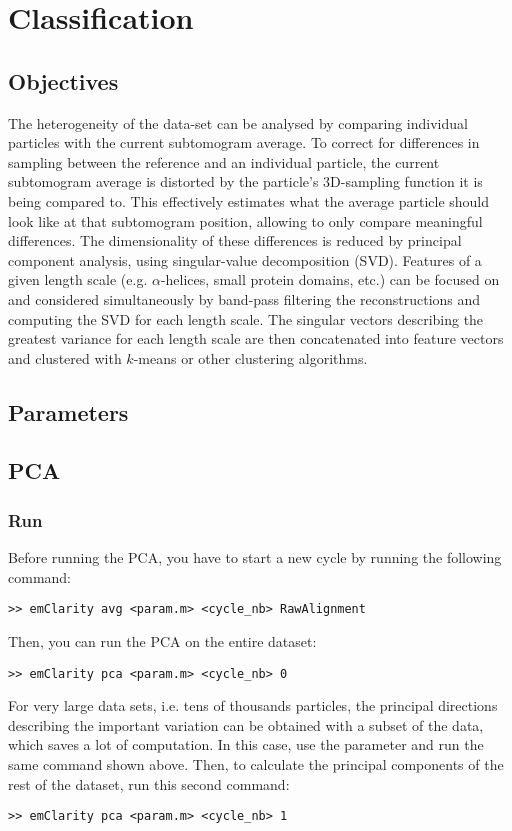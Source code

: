 \section{Classification} \label{sec:classification}

\subsection{Objectives}

The heterogeneity of the data-set can be analysed by comparing individual particles with the current subtomogram average. To correct for differences in sampling between the reference and an individual particle, the current subtomogram average is distorted by the particle's 3D-sampling function it is being compared to. This effectively estimates what the average particle should look like at that subtomogram position, allowing to only compare meaningful differences. The dimensionality of these differences is reduced by principal component analysis, using singular-value decomposition (SVD). Features of a given length scale (e.g. $\alpha$-helices, small protein domains, etc.) can be focused on and considered simultaneously by band-pass filtering the reconstructions and computing the SVD for each length scale. The singular vectors describing the greatest variance for each length scale are then concatenated into feature vectors and clustered with $k$-means or other clustering algorithms.


\subsection{Parameters}



\subsection{PCA}

\subsubsection{Run}

Before running the PCA, you have to start a new cycle by running the following command:
\begin{lstlisting}
>> emClarity avg <param.m> <cycle_nb> RawAlignment
\end{lstlisting}
Then, you can run the PCA on the entire dataset:
\begin{lstlisting}
>> emClarity pca <param.m> <cycle_nb> 0
\end{lstlisting}
For very large data sets, i.e. tens of thousands particles, the principal directions describing the important variation can be obtained with a subset of the data, which saves a lot of computation. In this case, use the  parameter and run the same command shown above. Then, to calculate the principal components of the rest of the dataset, run this second command:
\begin{lstlisting}
>> emClarity pca <param.m> <cycle_nb> 1
\end{lstlisting}

